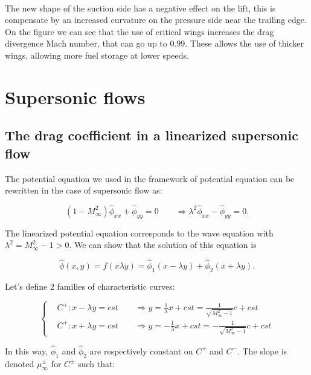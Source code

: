	\ \\ The new shape of the suction side has a negative effect on the lift, this is compensate by an increased curvature on the pressure side near the trailing edge. On the figure we can see that the use of critical wings increases the drag divergence Mach number, that can go up to 0.99. These allows the use of thicker wings, allowing more fuel storage at lower speeds. 
	
\section{Supersonic flows}
	\subsection{The drag coefficient in a linearized supersonic flow}
	The potential equation we used in the framework of potential equation can be rewritten in the case of supersonic flow as:
	
	\begin{equation}
		(1-M_\infty^2) \hat{\phi}_{xx} + \hat{\phi}_{yy} = 0 \qquad \Rightarrow \lambda ^2 \hat{\phi} _{xx} - \hat{\phi} _{yy} = 0.
	\end{equation}
	
	The linearized potential equation corresponds to the wave equation with $\lambda ^2 = M_\infty ^2 -1 >0$. We can show that the solution of this equation is 
	
	\begin{equation}
	\hat{\phi}(x,y)= f(x\lambda y) = \hat{\phi} _{1}(x-\lambda y) + \hat{\phi} _{2} (x+\lambda y).
	\end{equation}		
	
	Let's define 2 families of characteristic curves:
	
	\begin{equation}
	\left\{
	\begin{aligned}
	&C^+ : x-\lambda y = cst \qquad \Rightarrow y = \frac{1}{\lambda} x + cst = \frac{1}{\sqrt{M_\infty ^2 -1}} c + cst\\
	&C^+ : x+\lambda y = cst \qquad \Rightarrow y = -\frac{1}{\lambda} x + cst = -\frac{1}{\sqrt{M_\infty ^2 -1}} c + cst
	\end{aligned}
	\right.
	\end{equation}
	
	In this way, $\hat{\phi} _1$ and $\hat{\phi} _2$ are respectively constant on $C^+$ and $C^-$. The slope is denoted $\mu _\infty ^\pm$ for $C^\pm$ such that: 
	
